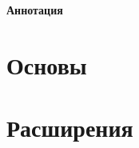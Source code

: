 \documentclass[usletter,11pt,oneside,onecolumn,final,openany]{report}
\begin{document}
\newpage
\pagestyle{empty}
\begin{center}
\vspace*{\fill}%
{\LARGE \bfseries Аннотация}
\end{center}
\vspace{0.5cm}
\begin{center} 
\begin{minipage}{6.43in}
\begin{center} \vrule width 4.5in height 0.4pt \end{center} 
\parindent=0pt 

\begin{center} \vrule width 4.5in height 0.4pt \end{center} 
\end{minipage} 
\vspace*{\fill}
\end{center}

\newpage
\pagestyle{plain}
\tableofcontents

%

\newpage
{}
\pagestyle{fancy}




\part{Основы}







\part{Расширения}





%


{\footnotesize


}


\addappheadtotoc
\appendixpage


\end{document}
